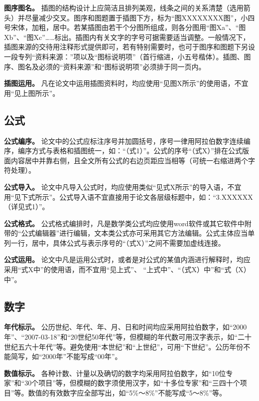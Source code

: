 \documentclass[singlesided]{Style/ucasthesis}%
\begin{document}
\textbf{图序图名。} 插图的结构设计上应简洁且排列美观，线条之间的关系清楚（选用箭头）并尽量减少交叉。图序和图题置于插图下方，标为``图XXXXXXXX图''，小四号宋体，加粗，居中。若某插图由若干个分图所组成，则各分图用``图Xa''、``图Xb''、``图Xc''\ldots{}\ldots{}标出。插图内有关文字的字号可据需要适当调整。一般情况下，插图来源的交待用注释形式提供即可，若有特别需要时，也可于图序和图题下另设一段专列``资料来源：''项以及``图标说明项''（首行缩进，小五号楷体）。插图、图序、图名及必须的``资料来源''和``图标说明项''必须排于同一页内。

\textbf{插图运用。} 凡在论文中运用插图资料时，均应使用``见图X所示''的使用语，不宜用``见上图所示''。

\hypertarget{section-28}{%
\subsection{公式}\label{section-28}}

\textbf{公式编序。} 论文中的公式应标注序号并加圆括号，序号一律用阿拉伯数字连续编序，编序方式与表格和插图统一，如：``（式1）''。公式的序号``（式X）''排在公式版面内容居中并靠右侧，且全文所有公式的右边页距应当相等（可统一右缩进两个字符处理）。

\textbf{公式导入。} 论文中凡导入公式时，均应使用类似``见式X所示''的导入语，不宜用``见下式所示''。公式导入语不宜直接用于论文各层级标题中，如：``3.XXXXXX（详见式1）''。

\textbf{公式格式。} 公式格式编排时，凡是数学类公式均应使用word软件或其它软件中附带的``公式编辑器''进行编辑，文本类公式亦可采用其它方法编辑。公式主体应当单列一行，居中，具体公式与表示序号的``（式X）''之间不需要加虚线连接。

\textbf{公式运用。} 论文中凡是运用公式时，或者是对公式的某值内涵进行解释时，均应采用``式X中''的使用语，而不宜用``见上式''、 ``上式中''、``（式X）中''和``式（X）中''。

\hypertarget{section-29}{%
\subsection{数字}\label{section-29}}

\textbf{年代标示。} 公历世纪、年代、年、月、日和时间均应采用阿拉伯数字，如``2000年''、``2007-03-18''和``20世纪50年代''等，但模糊的年代数可用汉字表示，如``二十世纪五六十年代''等。避免使用``本世纪''和``上世纪''，可用``下世纪''。公历年份不能简写，如``2000年''不能写成``00年''。

\textbf{数值标示。} 各种计数、计量以及确切的数字均采用阿拉伯数字，如``10位专家''和``30个项目''等，但模糊的数字须使用汉字，如``十多位专家''和``三四十个项目''等。数值的有效数字应全部写出，如``5\%～8\%''不能写成``5～8\%''等。
\end{document}
